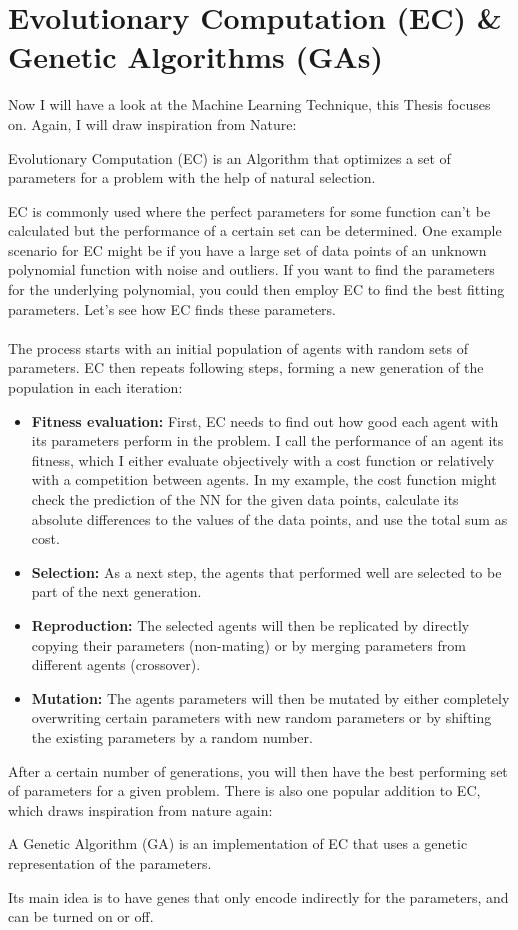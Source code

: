 \documentclass[11pt]{report}
\newcommand{\mydeflabel}{}
\newenvironment{mydef}[1]
{\renewcommand\mydeflabel{#1}\begin{mydefinner}}
{\end{mydefinner}}
\begin{document}
    \section{Evolutionary Computation (EC) \& Genetic Algorithms (GAs)}\label{sec:evolutionary-computation-(ec)-&-genetic-algorithms-(gas)}
    Now I will have a look at the Machine Learning Technique, this Thesis focuses on.
    Again, I will draw inspiration from Nature:
    \begin{mydef}{Evolutionary Computation}
        Evolutionary Computation (EC) is an Algorithm that optimizes a set of parameters for a problem with the help of natural selection.
    \end{mydef}
    EC is commonly used where the perfect parameters for some function can't be calculated but the performance of a certain set can be determined.
    One example scenario for EC might be if you have a large set of data points of an unknown polynomial function with noise and outliers.
    If you want to find the parameters for the underlying polynomial, you could then employ EC to find the best fitting parameters.
    Let's see how EC finds these parameters.
    \\ \\
    The process starts with an initial population of agents with random sets of parameters.
    EC then repeats following steps, forming a new generation of the population in each iteration:
    \begin{itemize}
        \item \textbf{Fitness evaluation:} First, EC needs to find out how good each agent with its parameters perform in the problem.
        I call the performance of an agent its fitness, which I either evaluate objectively with a cost function or relatively with a competition between agents.
        In my example, the cost function might check the prediction of the NN for the given data points, calculate its absolute differences to the values of the data points, and use the total sum as cost.
        \item \textbf{Selection:} As a next step, the agents that performed well are selected to be part of the next generation.
        \item \textbf{Reproduction:} The selected agents will then be replicated by directly copying their parameters (non-mating) or by merging parameters from different agents (crossover).
        \item \textbf{Mutation:} The agents parameters will then be mutated by either completely overwriting certain parameters with new random parameters or by shifting the existing parameters by a random number.
    \end{itemize}
    After a certain number of generations, you will then have the best performing set of parameters for a given problem.
    There is also one popular addition to EC, which draws inspiration from nature again:
    \begin{mydef}{Genetic Algorithm}
        A Genetic Algorithm (GA) is an implementation of EC that uses a genetic representation of the parameters.
    \end{mydef}
    Its main idea is to have genes that only encode indirectly for the parameters, and can be turned on or off.
\end{document}
